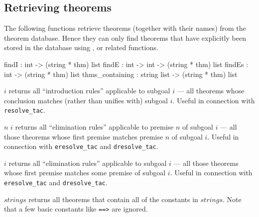 \subsection{Retrieving theorems}

The following functions retrieve theorems (together with their names) from
the theorem database.  Hence they can only find theorems that have explicitly
been stored in the database using ,  or
related functions.
\begin{ttbox} 
findI           :         int -> (string * thm) list
findE           :  int -> int -> (string * thm) list
findEs          :         int -> (string * thm) list
thms_containing : string list -> (string * thm) list
\end{ttbox}
\begin{ttdescription}
\item[\ttindexbold{findI} $i$]
  returns all ``introduction rules'' applicable to subgoal $i$ --- all
  theorems whose conclusion matches (rather than unifies with) subgoal
  $i$.  Useful in connection with {\tt resolve_tac}.

\item[\ttindexbold{findE} $n$ $i$] returns all ``elimination rules''
  applicable to premise $n$ of subgoal $i$ --- all those theorems whose
  first premise matches premise $n$ of subgoal $i$.  Useful in connection with
  {\tt eresolve_tac} and {\tt dresolve_tac}.

\item[\ttindexbold{findEs} $i$] returns all ``elimination rules'' applicable
  to subgoal $i$ --- all those theorems whose first premise matches some
  premise of subgoal $i$.  Useful in connection with {\tt eresolve_tac} and
  {\tt dresolve_tac}.

\item[\ttindexbold{thms_containing} $strings$] returns all theorems that
  contain all of the constants in $strings$.  Note that a few basic constants
  like \verb$==>$ are ignored.
\end{ttdescription}


